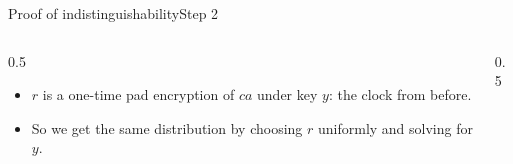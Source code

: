 \ifdefined\PRESENTATION\else\PassOptionsToClass{handout}{beamer}\fi\documentclass[aspectratio=169, lualatex]{beamer}
\begin{document}
\begin{frame}{Proof of indistinguishability}{Step 2}
	\begin{columns}[c]
		\begin{column}{0.5\textwidth}
			\begin{itemize}[<+->]
				\item $r$ is a one-time pad encryption of $ca$ under key $y$: the clock from before.
				\item So we get the same distribution by choosing $r$ uniformly and solving for $y$.
			\end{itemize}
		\end{column}
		\begin{column}{0.5\textwidth}
			\begin{center}
			\end{center}
		\end{column}
	\end{columns}
\end{frame}
\end{document}
